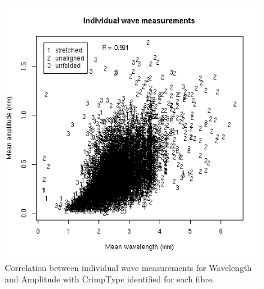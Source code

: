 %

\begin{figure}[!h]
  \centering
  \includegraphics[width=1.0\textwidth]{figsfwavemeas.png}
  \caption{Correlation between individual wave measurements for Wavelength and Amplitude with CrimpType identified for each fibre. }
  \label{fig:sfwavemeas}
\end{figure}

%

